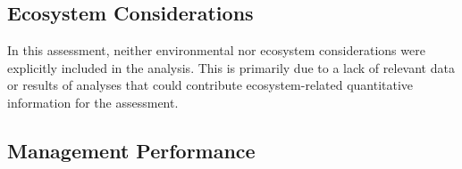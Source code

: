 \documentclass[12pt,]{article}
\begin{document}
\FloatBarrier

\newpage

\hypertarget{ecosystem-considerations}{%
\subsection*{Ecosystem Considerations}\label{ecosystem-considerations}}

In this assessment, neither environmental nor ecosystem considerations
were explicitly included in the analysis. This is primarily due to a
lack of relevant data or results of analyses that could contribute
ecosystem-related quantitative information for the assessment.

\hypertarget{management-performance}{%
\subsection*{Management Performance}\label{management-performance}}

\begin{table}[ht]
\centering
\caption{Recent trend in total catch (mt) relative to the 
                              management guidelines. Big skate was
                              managed in the Other Species complex in 2013 and 2014,
                              designated an Ecosystem Component species in 2015 and
                              2016, and managed with stock-specific harvest
                              specifications since 2017.} 
\label{tab:mnmgt_perform}
\end{table}
\end{document}
